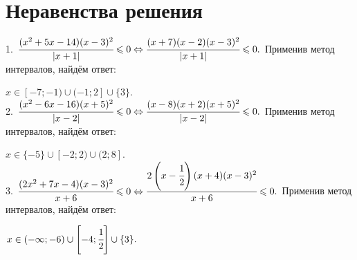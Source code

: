 \documentclass[12pt]{article}
\begin{document}
\section{Неравенства решения}
1. $\cfrac{(x^2+5x-14)(x-3)^2}{|x+1|}\leqslant0\Leftrightarrow\cfrac{(x+7)(x-2)(x-3)^2}{|x+1|}\leqslant0.$ Применив метод интервалов, найдём ответ:
\begin{figure}[ht!]
\end{figure}
$x\in[-7;-1)\cup(-1;2]\cup\{3\}.$\\
2. $\cfrac{(x^2-6x-16)(x+5)^2}{|x-2|}\leqslant0\Leftrightarrow\cfrac{(x-8)(x+2)(x+5)^2}{|x-2|}\leqslant0.$ Применив метод интервалов, найдём ответ:
\begin{figure}[ht!]
\end{figure}
$x\in\{-5\}\cup[-2;2)\cup(2;8].$\\
3. $\cfrac{(2x^2+7x-4)(x-3)^2}{x+6}\leqslant0\Leftrightarrow\cfrac{2\left(x-\cfrac{1}{2}\right)(x+4)(x-3)^2}{x+6}\leqslant0.$ Применив метод интервалов, найдём ответ:
\begin{figure}[ht!]
\end{figure}
$x\in(-\infty; -6)\cup\left[-4;\cfrac{1}{2}\right]\cup\{3\}.$\\
\end{document}
